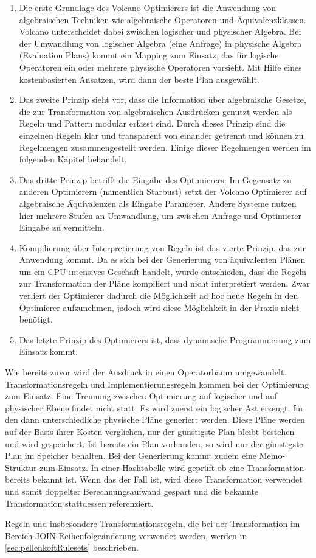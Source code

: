 \begin{enumerate}

\item Die erste Grundlage des Volcano Optimierers ist die Anwendung von algebraischen Techniken wie algebraische Operatoren und Äquivalenzklassen. Volcano unterscheidet dabei zwischen logischer und physischer Algebra. Bei der Umwandlung von logischer Algebra (eine Anfrage) in physische Algebra (Evaluation Plans) kommt ein Mapping zum Einsatz, das für logische Operatoren ein oder mehrere physische Operatoren vorsieht. Mit Hilfe eines kostenbasierten Ansatzen, wird dann der beste Plan ausgewählt.


\item Das zweite Prinzip sieht vor, dass die Information über algebraische Gesetze, die zur Transformation von algebraischen Ausdrücken genutzt werden als Regeln und Pattern modular erfasst sind. Durch dieses Prinzip sind die einzelnen Regeln klar und transparent von einander getrennt und können zu Regelmengen zusammengestellt werden. Einige dieser Regelmengen werden im folgenden Kapitel behandelt.


\item Das dritte Prinzip betrifft die Eingabe des Optimierers. Im Gegensatz zu anderen Optimierern (namentlich Starbust) setzt der Volcano Optimierer auf algebraische Äquivalenzen als Eingabe Parameter. Andere Systeme nutzen hier mehrere Stufen an Umwandlung, um zwischen Anfrage und Optimierer Eingabe zu vermitteln. 

\item Kompilierung über Interpretierung von Regeln ist das vierte Prinzip, das zur Anwendung kommt. Da es sich bei der Generierung von äquivalenten Plänen um ein CPU intensives Geschäft handelt, wurde entschieden, dass die Regeln zur Transformation der Pläne kompiliert und nicht interpretiert werden. Zwar verliert der Optimierer dadurch die Möglichkeit ad hoc neue Regeln in den Optimierer aufzunehmen, jedoch wird diese Möglichkeit in der Praxis nicht benötigt. 

\item Das letzte Prinzip des Optimierers ist, dass dynamische Programmierung zum Einsatz kommt.
\end{enumerate}


Wie bereits zuvor wird der Ausdruck in einen Operatorbaum umgewandelt. Transformationsregeln und Implementierungsregeln kommen bei der Optimierung zum Einsatz. Eine Trennung zwischen Optimierung auf logischer und auf physischer Ebene findet nicht statt. Es wird zuerst ein logischer Ast erzeugt, für den dann unterschiedliche physische Pläne generiert werden. Diese Pläne werden auf der Basis ihrer Kosten verglichen, nur der günstigste Plan bleibt bestehen und wird gespeichert. Ist bereits ein Plan vorhanden, so wird nur der günstigste Plan im Speicher behalten. Bei der Generierung kommt zudem eine Memo-Struktur zum Einsatz. In einer Hashtabelle wird geprüft ob eine Transformation bereits bekannt ist. Wenn das der Fall ist, wird diese Transformation verwendet und somit doppelter Berechnungsaufwand gespart und die bekannte Transformation stattdessen referenziert.

Regeln und insbesondere Transformationsregeln, die bei der Transformation im Bereich JOIN-Reihenfolgeänderung verwendet werden, werden in \ref{sec:pellenkoftRulesets} beschrieben.

